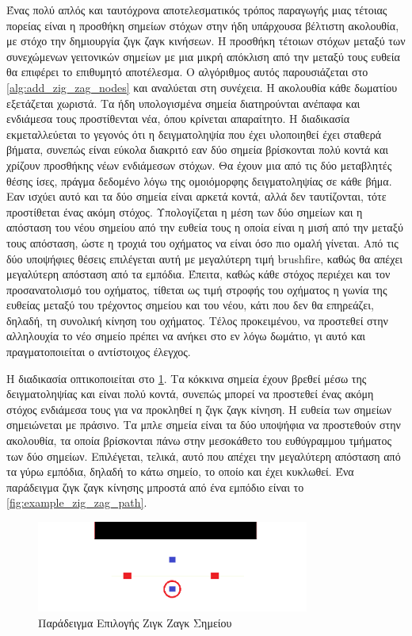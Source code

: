 Ένας πολύ απλός και ταυτόχρονα αποτελεσματικός τρόπος παραγωγής μιας τέτοιας πορείας είναι η προσθήκη σημείων στόχων στην ήδη υπάρχουσα βέλτιστη ακολουθία, με στόχο την δημιουργία ζιγκ ζαγκ κινήσεων. Η προσθήκη τέτοιων στόχων μεταξύ των συνεχώμενων γειτονικών σημείων με μια μικρή απόκλιση από την μεταξύ τους ευθεία θα επιφέρει το επιθυμητό αποτέλεσμα. Ο αλγόριθμος αυτός παρουσιάζεται στο \ref{alg:add_zig_zag_nodes} και αναλύεται στη συνέχεια. Η ακολουθία κάθε δωματίου εξετάζεται χωριστά. Τα ήδη υπολογισμένα σημεία διατηρούνται ανέπαφα και ενδιάμεσα τους προστίθενται νέα, όπου κρίνεται απαραίτητο. Η διαδικασία εκμεταλλεύεται το γεγονός ότι η δειγματοληψία που έχει υλοποιηθεί έχει σταθερά βήματα, συνεπώς είναι εύκολα διακριτό εαν δύο σημεία βρίσκονται πολύ κοντά και χρίζουν προσθήκης νέων ενδιάμεσων στόχων. Θα έχουν μια από τις δύο μεταβλητές θέσης ίσες, πράγμα δεδομένο λόγω της ομοιόμορφης δειγματοληψίας σε κάθε βήμα. Εαν ισχύει αυτό και τα δύο σημεία είναι αρκετά κοντά, αλλά δεν ταυτίζονται, τότε προστίθεται ένας ακόμη στόχος. Υπολογίζεται η μέση των δύο σημείων και η απόσταση του νέου σημείου από την ευθεία τους η οποία είναι η μισή από την μεταξύ τους απόσταση, ώστε η τροχιά του οχήματος να είναι όσο πιο ομαλή γίνεται. Από τις δύο υποψήφιες θέσεις επιλέγεται αυτή με μεγαλύτερη τιμή brushfire, καθώς θα απέχει μεγαλύτερη απόσταση από τα εμπόδια. Έπειτα, καθώς κάθε στόχος περιέχει και τον προσανατολισμό του οχήματος, τίθεται ως τιμή στροφής του οχήματος η γωνία της ευθείας μεταξύ του τρέχοντος σημείου και του νέου, κάτι που δεν θα επηρεάζει, δηλαδή, τη συνολική κίνηση του οχήματος. Τέλος προκειμένου, να προστεθεί στην αλληλουχία το νέο σημείο πρέπει να ανήκει στο εν λόγω δωμάτιο, γι αυτό και πραγματοποιείται ο αντίστοιχος έλεγχος. 

Η διαδικασία οπτικοποιείται στο \ref{fig:example_zig_zag_choice}. Τα κόκκινα σημεία έχουν βρεθεί μέσω της δειγματοληψίας και είναι πολύ κοντά, συνεπώς μπορεί να προστεθεί ένας ακόμη στόχος ενδιάμεσα τους για να προκληθεί η ζιγκ ζαγκ κίνηση. Η ευθεία των σημείων σημειώνεται με πράσινο. Τα μπλε σημεία είναι τα δύο υποψήφια να προστεθούν στην ακολουθία, τα οποία βρίσκονται πάνω στην μεσοκάθετο του ευθύγραμμου τμήματος των δύο σημείων. Επιλέγεται, τελικά, αυτό που απέχει την μεγαλύτερη απόσταση από τα γύρω εμπόδια, δηλαδή το κάτω σημείο, το οποίο και έχει κυκλωθεί. Ένα παράδειγμα ζιγκ ζαγκ κίνησης μπροστά από ένα εμπόδιο είναι το \ref{fig:example_zig_zag_path}.


\begin{figure}[!htb]
    \centering
    \includegraphics[width=0.8\textwidth]{./images/chapter5/example_zig_zag_choice.png}
    \caption{Παράδειγμα Επιλογής Ζιγκ Ζαγκ Σημείου}
    \label{fig:example_zig_zag_choice}
\end{figure}




